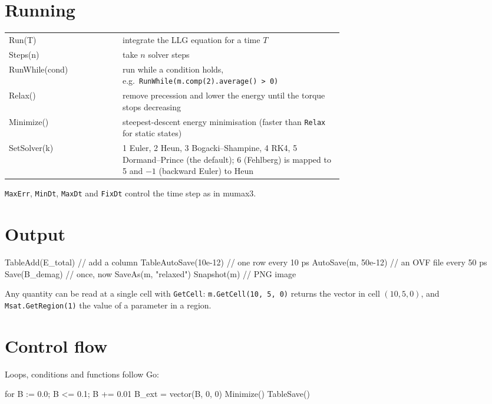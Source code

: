 \documentclass[11pt,a4paper,oneside]{book}
\newcommand{\code}[1]{\texttt{#1}}
\renewcommand{\_}{\textunderscore\allowbreak}
\begin{document}
\section{Running}
\begin{center}
\begin{tabular}{>{\ttfamily}l p{0.66\linewidth}}
\toprule
Run(T) & integrate the LLG equation for a time $T$ \\
Steps(n) & take $n$ solver steps \\
RunWhile(cond) & run while a condition holds, e.g.\ \code{RunWhile(m.comp(2).average() > 0)} \\
Relax() & remove precession and lower the energy until the torque stops decreasing \\
Minimize() & steepest-descent energy minimisation (faster than \code{Relax} for static states) \\
SetSolver(k) & 1 Euler, 2 Heun, 3 Bogacki--Shampine, 4 RK4, 5 Dormand--Prince (the default); 6 (Fehlberg) is
mapped to 5 and $-1$ (backward Euler) to Heun \\
\bottomrule
\end{tabular}
\end{center}
\code{MaxErr}, \code{MinDt}, \code{MaxDt} and \code{FixDt} control the time step as in mumax3.

\section{Output}
\begin{mxcode}
TableAdd(E_total)           // add a column
TableAutoSave(10e-12)       // one row every 10 ps
AutoSave(m, 50e-12)         // an OVF file every 50 ps
Save(B_demag)               // once, now
SaveAs(m, "relaxed")
Snapshot(m)                 // PNG image
\end{mxcode}
Any quantity can be read at a single cell with \code{GetCell}: \code{m.GetCell(10, 5, 0)} returns the vector in
cell $(10, 5, 0)$, and \code{Msat.GetRegion(1)} the value of a parameter in a region.

\section{Control flow}

Loops, conditions and functions follow Go:
\begin{mxcode}
for B := 0.0; B <= 0.1; B += 0.01 {
    B_ext = vector(B, 0, 0)
    Minimize()
    TableSave()
}
\end{mxcode}
\end{document}

